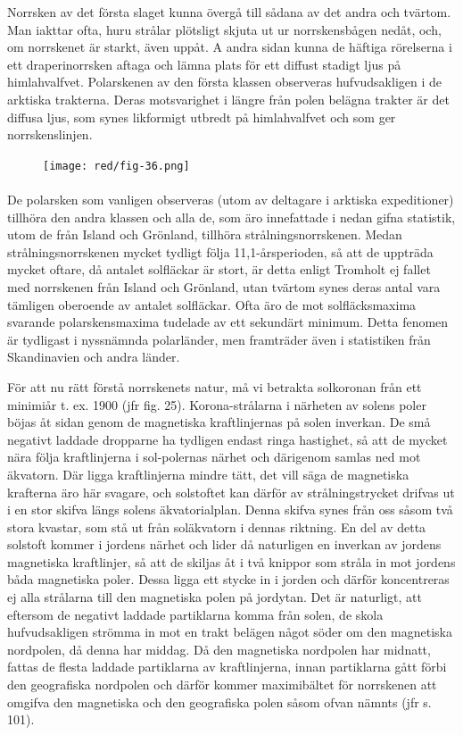 \documentclass[a4paper, 12pt, oneside, swedish]{article}
\begin{document}
Norrsken av det första slaget kunna övergå till sådana av det andra och tvärtom. Man iakttar ofta, huru strålar plötsligt skjuta ut ur norrskensbågen nedåt, och, om norrskenet är starkt, även uppåt. A andra sidan kunna de häftiga rörelserna i ett draperinorrsken aftaga och lämna plats för ett diffust stadigt ljus på himlahvalfvet. Polarskenen av den första klassen observeras hufvudsakligen i de arktiska trakterna. Deras motsvarighet i längre från polen belägna trakter är det diffusa ljus, som synes likformigt utbredt på himlahvalfvet och som ger norrskenslinjen.

\begin{figure}[H]
\centering
\texttt{[image: red/fig-36.png]}
\caption{}
\end{figure}
\paragraph{}
De polarsken som vanligen observeras (utom av deltagare i arktiska expeditioner) tillhöra den andra klassen och alla de, som äro innefattade i nedan gifna statistik, utom de från Island och Grönland, tillhöra strålningsnorrskenen. Medan strålningsnorrskenen mycket tydligt följa 11,1-årsperioden, så att de uppträda mycket oftare, då antalet solfläckar är stort, är detta enligt Tromholt ej fallet med norrskenen från Island och Grönland, utan tvärtom synes deras antal vara tämligen oberoende av antalet solfläckar. Ofta äro de mot solfläcksmaxima svarande polarskensmaxima tudelade av ett sekundärt minimum. Detta fenomen är tydligast i nyssnämnda polarländer, men framträder även i statistiken från Skandinavien och andra länder.

För att nu rätt förstå norrskenets natur, må vi betrakta solkoronan från ett minimiår t. ex. 1900 (jfr fig. 25). Korona-strålarna i närheten av solens poler böjas åt sidan genom de magnetiska kraftlinjernas på solen inverkan. De små negativt laddade dropparne ha tydligen endast ringa hastighet, så att de mycket nära följa kraftlinjerna i sol-polernas närhet och därigenom samlas ned mot äkvatorn. Där ligga kraftlinjerna mindre tätt, det vill säga de magnetiska krafterna äro här svagare, och solstoftet kan därför av strålningstrycket drifvas ut i en stor skifva längs solens äkvatorialplan. Denna skifva synes från oss såsom två stora kvastar, som stå ut från soläkvatorn i dennas riktning. En del av detta solstoft kommer i jordens närhet och lider då naturligen en inverkan av jordens magnetiska kraftlinjer, så att de skiljas åt i två knippor som stråla in mot jordens båda magnetiska poler. Dessa ligga ett stycke in i jorden och därför koncentreras ej alla strålarna till den magnetiska polen på jordytan. Det är naturligt, att eftersom de negativt laddade partiklarna komma från solen, de skola hufvudsakligen strömma in mot en trakt belägen något söder om den magnetiska nordpolen, då denna har middag. Då den magnetiska nordpolen har midnatt, fattas de flesta laddade partiklarna av kraftlinjerna, innan partiklarna gått förbi den geografiska nordpolen och därför kommer maximibältet för norrskenen att omgifva den magnetiska och den geografiska polen såsom ofvan nämnts (jfr s. 101).
\end{document}
